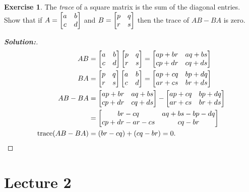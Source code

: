 \documentclass[a4paper]{amsart}
\theoremstyle{definition}
\newtheorem{exercise}{Exercise}
\newenvironment{solution}{\begin{proof}[\textbf{Solution:}] \vphantom{u}}{\end{proof}}
\begin{document}
\begin{exercise}\label{ex-commutator-trace}
 The \emph{trace} of a square matrix is the sum of the diagonal
 entries.  Show that if $A=\left[\begin{matrix} a&b\\c&d\end{matrix}\right]$ and
 $B=\left[\begin{matrix} p&q\\r&s\end{matrix}\right]$ then the trace of $AB-BA$ is zero.
\end{exercise}
\begin{solution}
 \begin{align*}
  AB &= \left[\begin{matrix} a&b\\c&d\end{matrix}\right] \left[\begin{matrix} p&q\\r&s\end{matrix}\right]
      = \left[\begin{matrix} ap+br & aq+bs \\ cp+dr & cq+ds \end{matrix}\right] \\
  BA &= \left[\begin{matrix} p&q\\r&s\end{matrix}\right] \left[\begin{matrix} a&b\\c&d\end{matrix}\right]
      = \left[\begin{matrix} ap+cq & bp+dq \\ ar+cs & br+ds \end{matrix}\right] \\
  AB-BA &= \left[\begin{matrix} ap+br & aq+bs \\ cp+dr & cq+ds \end{matrix}\right] -
           \left[\begin{matrix} ap+cq & bp+dq \\ ar+cs & br+ds \end{matrix}\right] \\
        &= \left[\begin{matrix} br-cq & aq+bs-bp-dq \\ cp+dr-ar-cs & cq-br \end{matrix}\right] \\
  \text{trace}(AB-BA) &= (br-cq) + (cq-br) = 0. 
 \end{align*}
\end{solution}

\section{Lecture 2}
\end{document}
